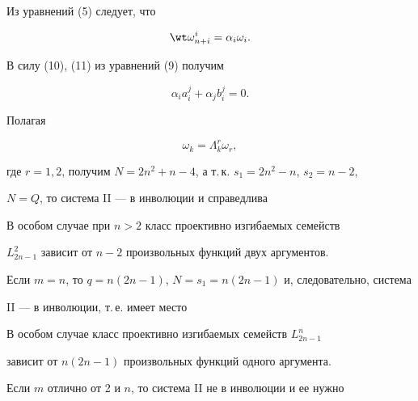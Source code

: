 Из уравнений (5) следует, что 


\begin{equation} 


\wt\omega^i_{n+i}=\alpha_i\omega_i. 


\end{equation} 


В силу (10), (11) из уравнений (9) получим 


\begin{equation} 


\alpha_i a^j_i+\alpha_j b^j_i=0. 


\end{equation} 


Полагая 


\begin{equation} 


\omega_k=\Lambda^r_k\omega_r, 


\end{equation} 


где $r=1,2$, получим $N=2n^2+n-4$, а т.\,к. $s_1=2n^2-n$, $s_2=n-2$, 


$N=Q$, то система II --- в инволюции и справедлива 


 


\begin{thm} 


В особом случае при $n>2$ класс проективно изгибаемых семейств 


$L^2_{2n-1}$ зависит от $n-2$ произвольных функций двух аргументов. 


\end{thm} 


 


Если $m=n$, то $q=n(2n-1)$, $N=s_1=n(2n-1)$ и, следовательно, система 


II --- в инволюции, т.\,е. имеет место 


 


\begin{thm} 


В особом случае класс проективно изгибаемых семейств $L^n_{2n-1}$ 


зависит от $n(2n-1)$ произвольных функций одного аргумента. 


\end{thm} 


 


Если $m$ отлично от 2 и $n$, то система II не в инволюции и ее нужно 


